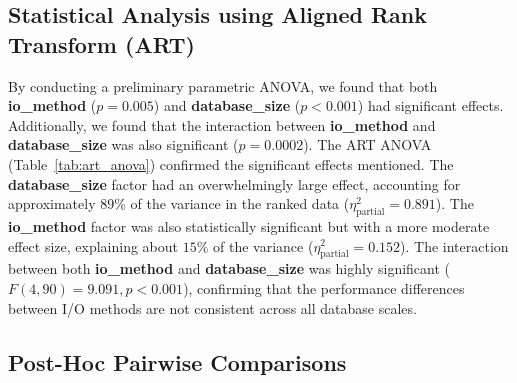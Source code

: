 \documentclass[conference]{IEEEtran}
\begin{document}

\subsection{Statistical Analysis using Aligned Rank Transform (ART)}

By conducting a preliminary parametric ANOVA, we found that both \textbf{io\_method} ($p = 0.005$) and \textbf{database\_size} ($p<0.001$) had significant effects. Additionally, we found that the interaction between \textbf{io\_method} and \textbf{database\_size} was also significant ($p = 0.0002$). The ART ANOVA (Table~\ref{tab:art_anova}) confirmed the significant effects mentioned. The \textbf{database\_size} factor had an overwhelmingly large effect, accounting for approximately $89\%$ of the variance in the ranked data ($\eta^2_{\text{partial}} = 0.891$). The \textbf{io\_method} factor was also statistically significant but with a more moderate effect size, explaining about $15\%$ of the variance ($\eta^2_{\text{partial}} = 0.152$). The interaction between both \textbf{io\_method} and \textbf{database\_size} was highly significant ($F(4,90)=9.091, p < 0.001$), confirming that the performance differences between I/O methods are not consistent across all database scales.

\begin{table}[htbp]
\centering
\caption{Analysis of Variance of Aligned Rank Transformed Data (ART)}
\label{tab:art_anova}
\end{table}


\subsection{Post-Hoc Pairwise Comparisons}
\end{document}
